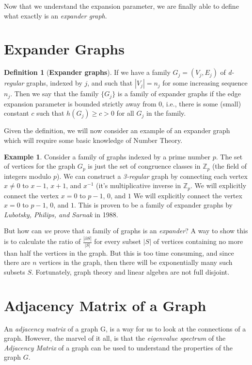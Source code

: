 \documentclass{article}
\theoremstyle{theorem}
\theoremstyle{definition}
\newtheorem{definition}{Definition}[section]
\theoremstyle{example}
\newtheorem{example}{Example}[section]
\theoremstyle{proposition}
\begin{document}
        Now that we understand the expansion parameter, we are finally able to define what exactly is an \textit{expander graph}.

        \section{Expander Graphs}
        \begin{definition}[\textbf{Expander graphs}]
            If we have a family $G_j = (V_j, E_j)$ of \textit{d-regular} graphs, indexed by $j$, and such that $|V_j| = n_j$ for some increasing sequence $n_j$. Then we say that the family $\{G_j\}$ is a family of expander graphs if the edge expansion parameter is bounded strictly away from 0, i.e., there is some (small) constant $c$ such that $h(G_j) \geq c > 0$ for all $G_j$ in the family.
        \end{definition}
        
        Given the definition, we will now consider an example of an expander graph which will require some basic knowledge of Number Theory.
        \begin{example}
            Consider a family of graphs indexed by a prime number $p$. The set of vertices for the graph $G_p$ is just the set of congruence classes in $\mathbb{Z}_p$ (the field of integers modulo $p$). We can construct a \textit{3-regular} graph by connecting each vertex $x \not= 0$ to $x-1$, $x+1$, and $x^{-1}$ (it's multiplicative inverse in $\mathbb{Z}_p$.
            We will explicitly connect the vertex $x = 0$ to $p - 1$, $0$, and $1$
            We will explicitly connect the vertex $x = 0$ to $p - 1$, $0$, and $1$.
            This is proven to be a family of expander graphs by \textit{Lubotsky, Philips, and Sarnak} in 1988.
        \end{example}

        But how can \textit{we} prove that a family of graphs is an \textit{expander}?
        A way to show this is to calculate the ratio of $\frac{|\partial{S}|}{|S|}$ for every subset $|S|$ of vertices containing no more than half the vertices in the graph. But this is too time consuming, and since there are $n$ vertices in the graph, then there will be exponentially many such subsets $S$.
        Fortunately, graph theory and linear algebra are not full disjoint.

        \section{Adjacency Matrix of a Graph}
        An \textit{adjacency matrix} of a graph G, is a way for us to look at the connections of a graph. However, the marvel of it all, is that the \textit{eigenvalue spectrum} of the \textit{Adjacency Matrix} of a graph can be used to understand the properties of the graph $G$.
\end{document}

